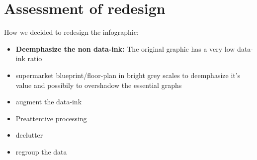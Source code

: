 \section{Assessment of redesign}

How we decided to redesign the infographic:

\begin{itemize}
	\item \textbf{Deemphasize the non data-ink:} The original graphic has a very low data-ink ratio
    \item supermarket blueprint/floor-plan in bright grey scales to deemphasize
		it's value and possibily to overshadow the essential graphs
	\item augment the data-ink
    \item Preattentive processing
	\item declutter
	\item regroup the data
\end{itemize}


